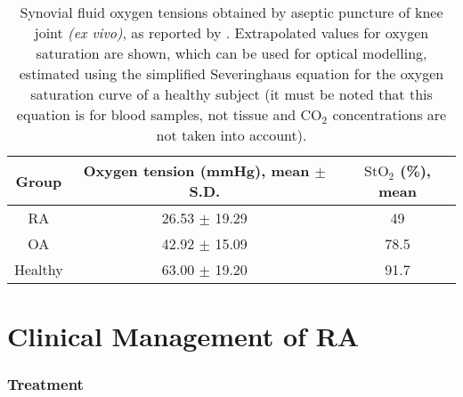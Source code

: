 \documentclass[twoside]{bhamthesis}
\theoremstyle{definition}
\begin{document}
\bgroup
\def\arraystretch{1.2}
\begin{table}[!ht]
\small
\begin{center}
 \begin{tabular}{c c c} 
 \hline
 Group & Oxygen tension (mmHg), mean $\pm$ S.D. &  $\mathrm{StO_2}$ (\%), mean \\ [0.4ex] 
 \hline
 RA & 26.53 $\pm$ 19.29 & 49 \\ 
 
 OA & 42.92 $\pm$ 15.09 & 78.5 \\
 
 Healthy & 63.00 $\pm$ 19.20 & 91.7 \\
 \hline
\end{tabular}
\caption[Synovial fluid oxygen tensions obtained by aseptic puncture of knee joint \textit{(ex vivo)}. Extrapolated values for oxygen saturation are shown, which can be used for optical modelling, estimated using the simplified Severinghaus equation for the oxygen saturation curve of a healthy subject (it must be noted that this equation is for blood samples, not tissue and CO$_2$ concentrations are not taken into account)]{Synovial fluid oxygen tensions obtained by aseptic puncture of knee joint \textit{(ex vivo)}, as reported by \cite{lund1970oxygen}. Extrapolated values for oxygen saturation are shown, which can be used for optical modelling, estimated using the simplified Severinghaus equation for the oxygen saturation curve of a healthy subject \cite{collins2015relating} (it must be noted that this equation is for blood samples, not tissue and CO$_2$ concentrations are not taken into account).}
\label{tab:OxygenTable}
\end{center}
\end{table}
\egroup
 
\section{Clinical Management of RA}
\label{Clinical Management of RA}

\subsubsection{Treatment}
\end{document}
